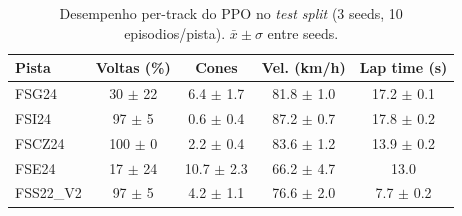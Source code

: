 \begin{table}[H]
\centering
\caption{Desempenho per-track do PPO no \textit{test split} (3 seeds, 10 episodios/pista). $\bar{x}\pm\sigma$ entre seeds.}
\label{tab:per_track_PPO}
\begin{tabular}{lcccc}
\toprule
\textbf{Pista} & \textbf{Voltas (\%)} & \textbf{Cones} & \textbf{Vel. (km/h)} & \textbf{Lap time (s)} \\
\midrule
FSG24 & 30 $\pm$ 22 & 6.4 $\pm$ 1.7 & 81.8 $\pm$ 1.0 & 17.2 $\pm$ 0.1 \\
FSI24 & 97 $\pm$ 5 & 0.6 $\pm$ 0.4 & 87.2 $\pm$ 0.7 & 17.8 $\pm$ 0.2 \\
FSCZ24 & 100 $\pm$ 0 & 2.2 $\pm$ 0.4 & 83.6 $\pm$ 1.2 & 13.9 $\pm$ 0.2 \\
FSE24 & 17 $\pm$ 24 & 10.7 $\pm$ 2.3 & 66.2 $\pm$ 4.7 & 13.0 \\
FSS22\_V2 & 97 $\pm$ 5 & 4.2 $\pm$ 1.1 & 76.6 $\pm$ 2.0 & 7.7 $\pm$ 0.2 \\
\bottomrule
\end{tabular}
\end{table}
